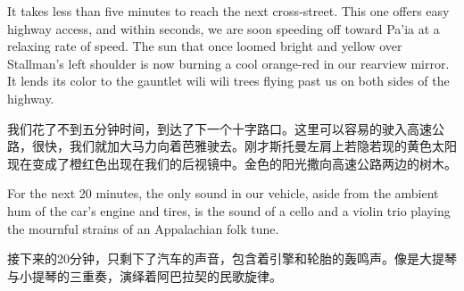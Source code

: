 \ifdefined\eng
It takes less than five minutes to reach the next cross-street. This one offers easy highway access, and within seconds, we are soon speeding off toward Pa'ia at a relaxing rate of speed. The sun that once loomed bright and yellow over Stallman's left shoulder is now burning a cool orange-red in our rearview mirror. It lends its color to the gauntlet wili wili trees flying past us on both sides of the highway.
\fi

\ifdefined\chs
我们花了不到五分钟时间，到达了下一个十字路口。这里可以容易的驶入高速公路，很快，我们就加大马力向着芭雅驶去。刚才斯托曼左肩上若隐若现的黄色太阳现在变成了橙红色出现在我们的后视镜中。金色的阳光撒向高速公路两边的树木。
\fi

\ifdefined\eng
For the next 20 minutes, the only sound in our vehicle, aside from the ambient hum of the car's engine and tires, is the sound of a cello and a violin trio playing the mournful strains of an Appalachian folk tune.
\fi

\ifdefined\chs
接下来的20分钟，只剩下了汽车的声音，包含着引擎和轮胎的轰鸣声。像是大提琴与小提琴的三重奏，演绎着阿巴拉契的民歌旋律。
\fi

\theendnotes
\setcounter{endnote}{0}

